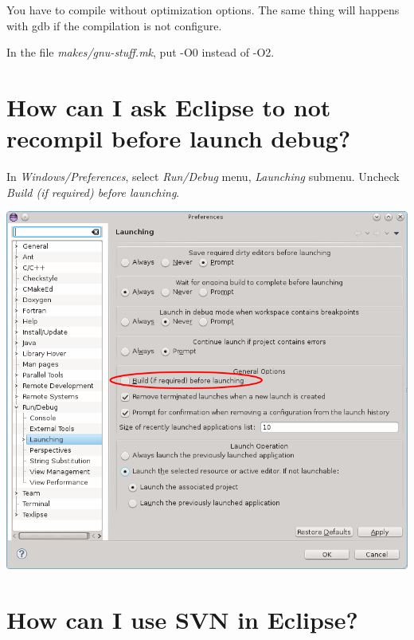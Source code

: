 \documentclass[a4paper]{article}
\begin{document}
You have to compile without optimization options. The same thing will happens with gdb if the compilation is not configure.

In the file \emph{makes/gnu-stuff.mk}, put -O0 instead of -O2.



\section{How can I ask Eclipse to not recompil before launch debug?}

In \emph{Windows/Preferences}, select \emph{Run/Debug} menu, \emph{Launching} submenu. Uncheck \emph{Build (if required) before launching}.
\begin{center}
\noindent
\includegraphics[scale=0.4]{eclipse/09-eclipseJUNO-launchConfig.png}
\end{center}

\section{How can I use SVN in Eclipse?}
\end{document}
